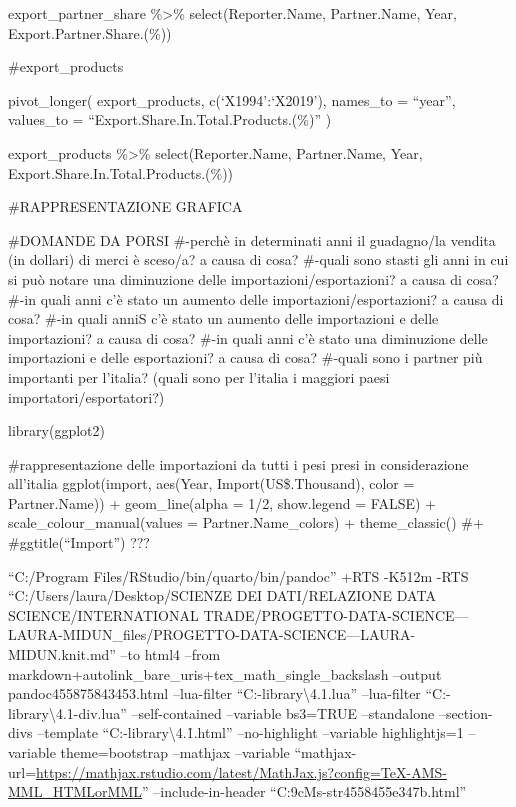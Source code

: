 \documentclass[
]{article}
\begin{document}
export\_partner\_share \%\textgreater\% select(Reporter.Name,
Partner.Name, Year, Export.Partner.Share.(\%))

\#export\_products

pivot\_longer( export\_products, c(`X1994':`X2019'), names\_to =
``year'', values\_to = ``Export.Share.In.Total.Products.(\%)'' )

export\_products \%\textgreater\% select(Reporter.Name, Partner.Name,
Year, Export.Share.In.Total.Products.(\%))

\#RAPPRESENTAZIONE GRAFICA

\#DOMANDE DA PORSI \#-perchè in determinati anni il guadagno/la vendita
(in dollari) di merci è sceso/a? a causa di cosa? \#-quali sono stasti
gli anni in cui si può notare una diminuzione delle
importazioni/esportazioni? a causa di cosa? \#-in quali anni c'è stato
un aumento delle importazioni/esportazioni? a causa di cosa? \#-in quali
anniS c'è stato un aumento delle importazioni e delle importazioni? a
causa di cosa? \#-in quali anni c'è stato una diminuzione delle
importazioni e delle esportazioni? a causa di cosa? \#-quali sono i
partner più importanti per l'italia? (quali sono per l'italia i maggiori
paesi importatori/esportatori?)

library(ggplot2)

\#rappresentazione delle importazioni da tutti i pesi presi in
considerazione all'italia ggplot(import, aes(Year,
Import(US\$.Thousand), color = Partner.Name)) + geom\_line(alpha = 1/2,
show.legend = FALSE) + scale\_colour\_manual(values =
Partner.Name\_colors) + theme\_classic() \#+ \#ggtitle(``Import'') ???

``C:/Program Files/RStudio/bin/quarto/bin/pandoc'' +RTS -K512m -RTS
``C:/Users/laura/Desktop/SCIENZE DEI DATI/RELAZIONE DATA
SCIENCE/INTERNATIONAL
TRADE/PROGETTO-DATA-SCIENCE---LAURA-MIDUN\_files/PROGETTO-DATA-SCIENCE---LAURA-MIDUN.knit.md''
--to html4 --from
markdown+autolink\_bare\_uris+tex\_math\_single\_backslash --output
pandoc455875843453.html --lua-filter
``C:\Users\laura\Documents\R\win-library\textbackslash4.1\rmarkdown\rmarkdown\lua\pagebreak.lua''
--lua-filter
``C:\Users\laura\Documents\R\win-library\textbackslash4.1\rmarkdown\rmarkdown\lua\latex-div.lua''
--self-contained --variable bs3=TRUE --standalone --section-divs
--template
``C:\Users\laura\Documents\R\win-library\textbackslash4.1\rmarkdown\rmd\h{}.html''
--no-highlight --variable highlightjs=1 --variable theme=bootstrap
--mathjax --variable
``mathjax-url=\url{https://mathjax.rstudio.com/latest/MathJax.js?config=TeX-AMS-MML_HTMLorMML}''
--include-in-header
``C:\Users\laura\AppData\Local\Temp\RtmpAd9cMs\rmarkdown-str4558455e347b.html''
\end{document}
